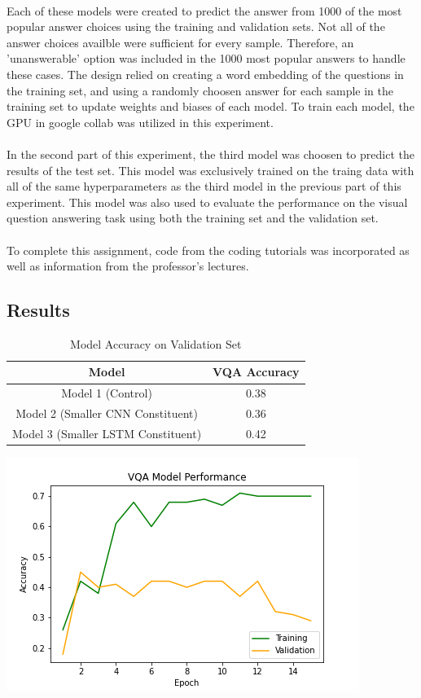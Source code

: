 \documentclass[12pt]{article}
\begin{document}
\\
Each of these models were created to predict the answer from 1000 of the most popular answer choices using the training and validation sets. Not all of the answer choices availble were sufficient for every sample. Therefore, an 'unanswerable' option was included in the 1000 most popular answers to handle these cases. The design relied on creating a word embedding of the questions in the training set, and using a randomly choosen answer for each sample in the training set to update weights and biases of each model. To train each model, the GPU in google collab was utilized in this experiment.\\
\\
In the second part of this experiment, the third model was choosen to predict the results of the test set. This model was exclusively trained on the traing data with all of the same hyperparameters as the third model in the previous part of this experiment. This model was also used to evaluate the performance on the visual question answering task using both the training set and the validation set.\\
\\
To complete this assignment, code from the coding tutorials was incorporated as well as information from the professor's lectures.
\subsection{Results}
\begin{table}[h!]
\caption{Model Accuracy on Validation Set}
\centering
\begin{tabular}{||c c||} 
 \hline
 Model & VQA Accuracy \\ [0.5ex] 
 \hline\hline
 Model 1 (Control) & 0.38 \\ 
 Model 2 (Smaller CNN Constituent)& 0.36 \\
 Model 3 (Smaller LSTM Constituent) & 0.42 \\ [1ex]
 \hline
\end{tabular}
\end{table}

\begin{center}
\includegraphics[scale=1]{vqa_model.png}
\end{center}
\newpage
\end{document}
